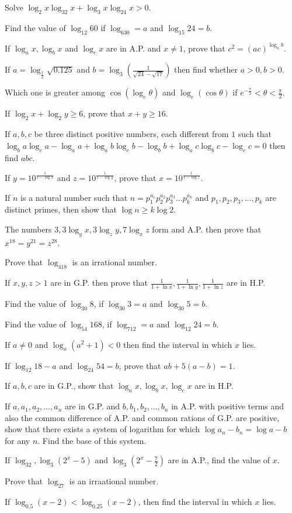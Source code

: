 \item Solve $\log_2x\log_32x + \log_3x\log_24x > 0$.
\item Find the value of $\log_{12}60$ if $\log_630 = a$ and $\log_{15}24 = b$.
\item If $\log_ax, \log_bx$ and $\log_cx$ are in A.P. and $x\neq 1$, prove that $c^2 = (ac)^{\log_ab}$.
\item If $a = \log_{\frac{1}{2}}\sqrt{0.125}$ and $b = \log_3\left(\frac{1}{\sqrt{24} - \sqrt{17}}\right)$ then find whether $a >0,
  b> 0$.
\item Which one is greater among $\cos(\log_e\theta)$ and $\log_e(\cos\theta)$ if $e^{-\frac{\pi}{2}} < \theta < \frac{\pi}{2}$.
\item If $\log_2x + \log_2y \geq 6$, prove that $x + y\geq 16$.
\item If $a,b,c$ be three distinct positive numbers, each different from $1$ such that $\log_ba\log_ca - \log_aa + \log_ab\log_cb
  - \log_bb + \log_ac\log_bc - \log_cc = 0$ then find $abc$.
\item If $y = 10^{\frac{1}{1 - \log x}}$ and $z = 10^{\frac{1}{1 - \log y}}$, prove that $x = 10^{\frac{1}{1 - \log z}}$.
\item If $n$ is a natural number such that $n = p_1^{a_1}p_2^{a_2}p_3^{a_3}\ldots p_k^{a_k}$ and $p_1, p_2, p_3, \ldots, p_k$ are
  distinct primes, then show that $\log n\geq k\log 2$.
\item The numbers $3, 3\log_yx, 3\log_zy, 7\log_xz$ form and A.P. then prove that $x^{18} = y^{21} = z^{28}$.
\item Prove that $\log_418$ is an irrational number.
\item If $x, y, z> 1$ are in G.P. then prove that $\frac{1}{1+ \ln x}, \frac{1}{1 + \ln y}, \frac{1}{1 + \ln z}$ are in H.P.
\item Find the value of $\log_{30}8$, if $\log_{30}3 = a$ and $\log_{30}5 = b$.
\item Find the value of $\log_{54}168$, if $\log_712 = a$ and $\log_{12}24 = b$.
\item If $a\neq 0$ and $\log_x(a^2 + 1) < 0$ then find the interval in which $x$ lies.
\item If $\log_{12}18 - a$ and $\log_{24}54=b$, prove that $ab + 5(a - b) = 1$.
\item If $a,b,c$ are in G.P., show that $\log_ax, \log_bx, \log_cx$ are in H.P.
\item If $a, a_1, a_2, \ldots, a_n$ are in G.P. and $b, b_1, b_2, \ldots, b_n$ in A.P. with positive terms and also the common
  difference of A.P. and common rations of G.P. are positive, show that there exists a system of logarithm for which $\log a_n -
  b_n = \log a - b$ for any $n$. Find the base of this system.
\item If $\log_32, \log_3(2^x - 5)$ and $\log_3\left(2^x - \frac{7}{2}\right)$ are in A.P., find the value of $x$.
\item Prove that $\log_27$ is an irraational number.
\item If $\log_{0.5}(x - 2) < \log_{0.25}(x - 2)$, then find the interval in which $x$ lies.
\stopitemize
